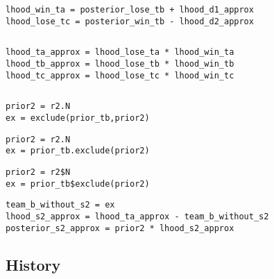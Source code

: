 \documentclass[article]{jss}
\newif\ifen
\newif\ifes
\newcommand{\en}[1]{\ifen#1\fi}
\newcommand{\es}[1]{\ifes#1\fi}
\begin{document}
\begin{lstlisting}[backgroundcolor=\color{all}]
lhood_win_ta = posterior_lose_tb + lhood_d1_approx
lhood_lose_tc = posterior_win_tb - lhood_d2_approx
\end{lstlisting}
%
\en{We are now able to compute the likelihood of each team.}
\es{Ahora estamos en condiciones de computar los likelihood de cada equipo.}
%
\begin{lstlisting}[backgroundcolor=\color
{white},label=lst:lhood_te_approx, caption=\relax, belowskip=-1.0 \baselineskip, aboveskip=-0 \baselineskip]
\end{lstlisting}
\begin{lstlisting}[backgroundcolor=\color{all}]
lhood_ta_approx = lhood_lose_ta * lhood_win_ta 
lhood_tb_approx = lhood_lose_tb * lhood_win_tb
lhood_tc_approx = lhood_lose_tc * lhood_win_tc
\end{lstlisting}
%
\en{As an example, we compute the posterior of player 2.}
\es{A modo de ejemplo, computamos el posterior del jugador 2.}
%
\begin{lstlisting}[backgroundcolor=\color
{white},label=lst:posterior_s2_approx, caption=\relax, belowskip=-1.0 \baselineskip, aboveskip=-0 \baselineskip]
\end{lstlisting}
\begin{paracol}{3}
\begin{lstlisting}[backgroundcolor=\color{julia},belowskip=-0.77 \baselineskip]
prior2 = r2.N
ex = exclude(prior_tb,prior2)
\end{lstlisting}
\switchcolumn
\begin{lstlisting}[backgroundcolor=\color{python},belowskip=-0.77 \baselineskip]
prior2 = r2.N
ex = prior_tb.exclude(prior2)
\end{lstlisting}
\switchcolumn
\begin{lstlisting}[backgroundcolor=\color{r},belowskip=-0.77 \baselineskip]
prior2 = r2$N
ex = prior_tb$exclude(prior2)
\end{lstlisting}
\end{paracol}
\begin{lstlisting}[backgroundcolor=\color{all}]
team_b_without_s2 = ex
lhood_s2_approx = lhood_ta_approx - team_b_without_s2 
posterior_s2_approx = prior2 * lhood_s2_approx 
\end{lstlisting}

\subsection{History} \label{sec:throguthTime}
\end{document}
